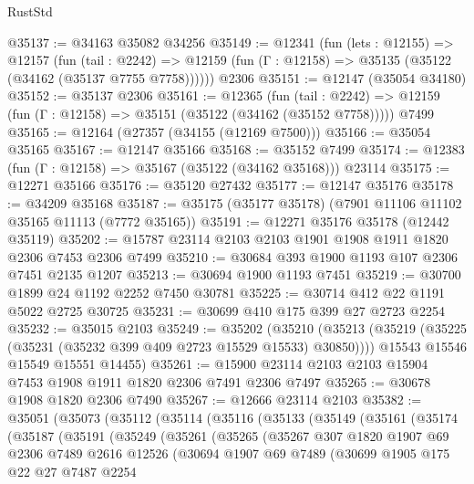 \begin{lexlean}{RustStd}
\begin{coremodule}
@35137 := @34163 @35082 @34256
@35149 := @12341
    (fun (lets : @12155) =>
    @12157
      (fun (tail : @2242) =>
      @12159 (fun (Γ : @12158) => @35135 (@35122 (@34162 (@35137 @7755 @7758))))))
    @2306
@35151 := @12147 (@35054 @34180)
@35152 := @35137 @2306
@35161 := @12365
    (fun (tail : @2242) => @12159 (fun (Γ : @12158) => @35151 (@35122 (@34162 (@35152 @7758)))))
    @7499
@35165 := @12164 (@27357 (@34155 (@12169 @7500)))
@35166 := @35054 @35165
@35167 := @12147 @35166
@35168 := @35152 @7499
@35174 := @12383 (fun (Γ : @12158) => @35167 (@35122 (@34162 @35168))) @23114
@35175 := @12271 @35166
@35176 := @35120 @27432
@35177 := @12147 @35176
@35178 := @34209 @35168
@35187 := @35175 (@35177 @35178) (@7901 @11106 @11102 @35165 @11113 (@7772 @35165))
@35191 := @12271 @35176 @35178 (@12442 @35119)
@35202 := @15787 @23114 @2103 @2103 @1901 @1908 @1911 @1820 @2306 @7453 @2306 @7499
@35210 := @30684 @393 @1900 @1193 @107 @2306 @7451 @2135 @1207
@35213 := @30694 @1900 @1193 @7451
@35219 := @30700 @1899 @24 @1192 @2252 @7450 @30781
@35225 := @30714 @412 @22 @1191 @5022 @2725 @30725
@35231 := @30699 @410 @175 @399 @27 @2723 @2254
@35232 := @35015 @2103
@35249 := @35202
    (@35210
      (@35213 (@35219 (@35225 (@35231 (@35232 @399 @409 @2723 @15529 @15533) @30850))))
      @15543
      @15546
      @15549
      @15551
      @14455)
@35261 := @15900 @23114 @2103 @2103 @15904 @7453 @1908 @1911 @1820 @2306 @7491 @2306 @7497
@35265 := @30678 @1908 @1820 @2306 @7490
@35267 := @12666 @23114 @2103
@35382 := @35051
    (@35073
      (@35112
        (@35114
          (@35116
            (@35133
              (@35149
                (@35161
                  (@35174
                    (@35187
                      (@35191
                        (@35249
                          (@35261
                            (@35265
                              (@35267
                                @307
                                @1820
                                @1907
                                @69
                                @2306
                                @7489
                                @2616
                                @12526
                                (@30694
                                  @1907
                                  @69
                                  @7489
                                  (@30699
                                    @1905
                                    @175
                                    @22
                                    @27
                                    @7487
                                    @2254

\end{coremodule}
\end{lexlean}
